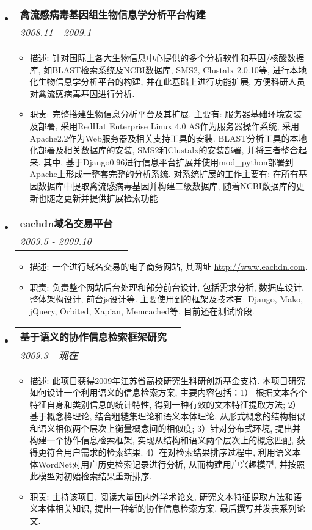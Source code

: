 \documentclass[letterpaper,11pt]{article}
\makeatletter
\newcommand{\resitem}[1]{\item #1 \vspace{-2pt}}
\newcommand{\ressubheading}[4]{
\begin{tabular*}{6.5in}{l@{\extracolsep{\fill}}r}
        \textbf{#1} & #2 \\
        \textit{#3} & \textit{#4} \\
\end{tabular*}\vspace{-6pt}}
\makeatother
\begin{document}
\begin{CJK*}{GBK}{kai}
\begin{itemize}
\item
    \ressubheading{禽流感病毒基因组生物信息学分析平台构建}{}{2008.11 - 2009.1}{}
    \begin{itemize}
        \resitem{   描述: 针对国际上各大生物信息中心提供的多个分析软件和基因/核酸数据库, 如BLAST检索系统及NCBI数据库, SMS2, Clustalx-2.0.10等, 进行本地化生物信息学分析平台的构建, 并在此基础上进行功能扩展, 方便科研人员对禽流感病毒基因进行分析.}
        \resitem{   职责: 完整搭建生物信息分析平台及其扩展. 主要有: 服务器基础环境安装及部署, 采用RedHat Enterprise Linux 4.0 AS作为服务器操作系统, 采用Apache2.2作为Web服务器及相关支持工具的安装. BLAST分析工具的本地化部署及相关数据库的安装, SMS2和Clustalx的安装部署, 并将三者整合起来. 其中, 基于Django0.96进行信息平台扩展并使用mod\_python部署到Apache上形成一整套完整的分析系统. 对系统扩展的工作主要有: 在所有基因数据库中提取禽流感病毒基因并构建二级数据库, 随着NCBI数据库的更新也随之更新并提供扩展检索功能.}
    \end{itemize}

\item
    \ressubheading{eachdn域名交易平台}{}{2009.5 - 2009.10}{}
    \begin{itemize}
        \resitem{   描述: 一个进行域名交易的电子商务网站, 其网址 \href{http://www.eachdn.com/}{http://www.eachdn.com}. }
        \resitem{   职责: 负责整个网站后台处理和部分前台设计, 包括需求分析, 数据库设计, 整体架构设计, 前台js设计等. 主要使用到的框架及技术有: Django, Mako, jQuery, Orbited, Xapian, Memcached等, 目前还在测试阶段.}
    \end{itemize}

\item
    \ressubheading{基于语义的协作信息检索框架研究}{}{2009.3 - 现在}{}
    \begin{itemize}
        \resitem{   描述: 此项目获得2009年江苏省高校研究生科研创新基金支持. 本项目研究如何设计一个利用语义的信息检索方案, 主要内容包括：1） 根据文本各个特征自身和类别信息的统计特性, 得到一种有效的文本特征提取方法; 2）基于概念格理论, 结合粗糙集理论和语义本体理论, 从形式概念的结构相似和语义相似两个层次上衡量概念间的相似度; 3）针对分布式环境, 提出并构建一个协作信息检索框架, 实现从结构和语义两个层次上的概念匹配, 获得更符合用户需求的检索结果. 4）在对检索结果排序过程中, 利用语义本体WordNet对用户历史检索记录进行分析, 从而构建用户兴趣模型, 并按照此模型对初始检索结果重新排序.}
        \resitem{   职责: 主持该项目, 阅读大量国内外学术论文, 研究文本特征提取方法和语义本体相关知识, 提出一种新的协作信息检索方案. 最后撰写并发表系列论文.}
    \end{itemize}
\end{itemize}


\end{CJK*}
\end{document}
